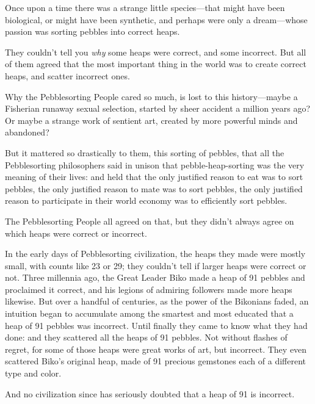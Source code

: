 \myendsectiontext


{
 Once upon a time there was a strange little species---that might
have been biological, or might have been synthetic, and perhaps were
only a dream---whose passion was sorting pebbles into correct heaps. }

{
 They couldn't tell you \textit{why} some heaps
were correct, and some incorrect. But all of them agreed that the most
important thing in the world was to create correct heaps, and scatter
incorrect ones.}

{
 Why the Pebblesorting People cared so much, is lost to this
history---maybe a Fisherian runaway sexual selection, started by sheer
accident a million years ago? Or maybe a strange work of sentient art,
created by more powerful minds and abandoned?}

{
 But it mattered so drastically to them, this sorting of pebbles,
that all the Pebblesorting philosophers said in unison that
pebble-heap-sorting was the very meaning of their lives: and held that
the only justified reason to eat was to sort pebbles, the only
justified reason to mate was to sort pebbles, the only justified reason
to participate in their world economy was to efficiently sort pebbles.}

{
 The Pebblesorting People all agreed on that, but they
didn't always agree on which heaps were correct or
incorrect.}

{
 In the early days of Pebblesorting civilization, the heaps they
made were mostly small, with counts like 23 or 29; they
couldn't tell if larger heaps were correct or not.
Three millennia ago, the Great Leader Biko made a heap of 91 pebbles
and proclaimed it correct, and his legions of admiring followers made
more heaps likewise. But over a handful of centuries, as the power of
the Bikonians faded, an intuition began to accumulate among the
smartest and most educated that a heap of 91 pebbles was incorrect.
Until finally they came to know what they had done: and they scattered
all the heaps of 91 pebbles. Not without flashes of regret, for some of
those heaps were great works of art, but incorrect. They even scattered
Biko's original heap, made of 91 precious gemstones
each of a different type and color.}

{
 And no civilization since has seriously doubted that a heap of 91
is incorrect.}

